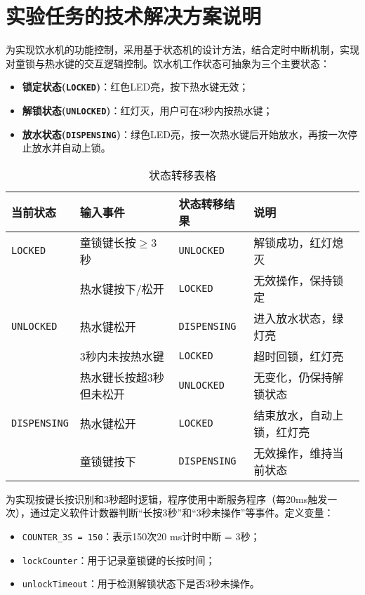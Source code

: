 \documentclass{article}
\newcommand{\code}[1]{\lstinline[basicstyle=\ttfamily,keywordstyle=\color{blue}]|#1|}
\newenvironment{itemlist}{
    \begin{itemize}[itemsep=0pt,topsep=1em,parsep=0pt,leftmargin=2em,labelsep=1em,itemindent=2em] 
}{
    \end{itemize}
}
\begin{document}
\section{实验任务的技术解决方案说明}
为实现饮水机的功能控制，采用基于状态机的设计方法，结合定时中断机制，实现对童锁与热水键的交互逻辑控制。饮水机工作状态可抽象为三个主要状态：
\begin{itemlist}
    \item \textbf{锁定状态(\code{LOCKED})}：红色LED亮，按下热水键无效；
    \item \textbf{解锁状态(\code{UNLOCKED})}：红灯灭，用户可在3秒内按热水键；
    \item \textbf{放水状态(\code{DISPENSING})}：绿色LED亮，按一次热水键后开始放水，再按一次停止放水并自动上锁。
\end{itemlist}
\begin{table}[H]
    \centering
    \begin{tabular}{llll}
        \toprule[1.5pt]
        \textbf{当前状态} & \textbf{输入事件} & \textbf{状态转移结果} & \textbf{说明} \\
        \midrule[1pt]
        \code{LOCKED} & 童锁键长按$\geq$3秒 & \code{UNLOCKED} & 解锁成功，红灯熄灭 \\
        \cline{2-4}
        ~ & 热水键按下/松开 & \code{LOCKED} & 无效操作，保持锁定 \\
        \midrule[1pt]
        \code{UNLOCKED} & 热水键松开 & \code{DISPENSING} & 进入放水状态，绿灯亮 \\
        \cline{2-4}
        ~ & 3秒内未按热水键 & \code{LOCKED} & 超时回锁，红灯亮 \\
        \cline{2-4}
        ~ & 热水键长按超3秒但未松开 & \code{UNLOCKED} & 无变化，仍保持解锁状态 \\
        \midrule[1pt]
        \code{DISPENSING} & 热水键松开 & \code{LOCKED} & 结束放水，自动上锁，红灯亮 \\
        \cline{2-4}
        ~ & 童锁键按下 & \code{DISPENSING} & 无效操作，维持当前状态 \\
        \bottomrule[1.5pt]
    \end{tabular}
    \caption{状态转移表格}
\end{table}

为实现按键长按识别和3秒超时逻辑，程序使用中断服务程序（每20ms触发一次），通过定义软件计数器判断“长按3秒”和“3秒未操作”等事件。定义变量：
\begin{itemlist}
    \item \code{COUNTER_3S = 150}：表示150次20 ms计时中断 = 3秒；
    \item \code{lockCounter}：用于记录童锁键的长按时间；
    \item \code{unlockTimeout}：用于检测解锁状态下是否3秒未操作。
\end{itemlist}
\end{document}

